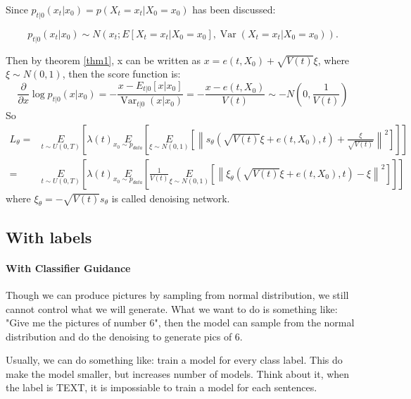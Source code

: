 Since  $p_{t|0}\left(x_{t} | x_{0}\right)=p\left(X_{t}=x_{t} | X_{0}=x_{0}\right)$  has been discussed:

$$p_{t | 0}\left(x_{t} | x_{0}\right) \sim N\left(x_{t} ; E\left[X_{t}=x_t | X_{0}=x_{0}\right], \operatorname{Var}\left(X_{t}=x_t | X_{0}=x_{0}\right)\right) .$$

Then by theorem \ref{thm1}, x can be written as $x=e(t, X_0)+\sqrt{V(t)}\xi$, where $\xi\sim N(0, 1)$, then the score function is:
\begin{equation}
    \frac{\partial}{\partial x} \log p_{t | 0}\left(x | x_{0}\right)=-\frac{x-E_{t | 0}\left[x | x_{0}\right]}{\operatorname{Var}_{t | 0}\left(x | x_{0}\right)}=-\frac{x-e(t, X_0)}{V(t)}\sim -N\left(0, \frac{1}{V(t)}\right)
\end{equation}
So
\begin{equation}
\begin{aligned}
    L_\theta=&\underset{t\sim U(0,T)}{E}\left[\lambda (t)\underset{x_0\sim p_{data}}{E}\left[\underset{\xi\sim N(0, 1)}{E}\left[\left\|s_\theta\left(\sqrt{V(t)}\xi+e(t, X_0), t\right) + \frac{\xi}{\sqrt{V(t)}}\right\|^2\right]\right]\right]\\
    =&\underset{t\sim U(0,T)}{E}\left[\lambda (t)\underset{x_0\sim p_{data}}{E}\left[\frac{1}{V(t)}\underset{\xi\sim N(0, 1)}{E}\left[\left\|\xi_\theta\left(\sqrt{V(t)}\xi+e(t, X_0), t\right)-\xi\right\|^2\right]\right]\right]
\end{aligned}    
\end{equation}
where $\xi_\theta = -\sqrt{V(t)}s_\theta$ is called denoising network.

\subsection{With labels}

\paragraph{With Classifier Guidance}
Though we can produce pictures by sampling from normal distribution, we still cannot control what we will generate. What we want to do is something like:
"Give me the pictures of number 6", then the model can sample from the normal distribution and do the denoising to generate pics of 6. 

Usually, we can do something like: train a model for every class label. This do make the model smaller, but increases number of models. 
Think about it, when the label is TEXT, it is impossiable to train a model for each sentences. 

